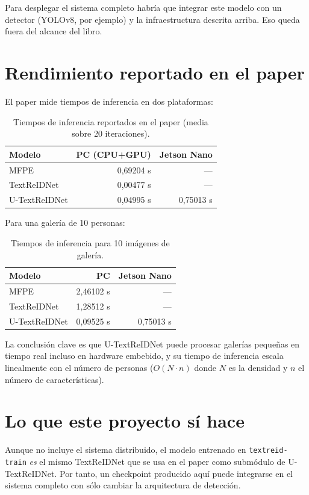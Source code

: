 Para desplegar el sistema completo habría que integrar este modelo
con un detector (YOLOv8, por ejemplo) y la infraestructura
descrita arriba. Eso queda fuera del alcance del libro.

\section{Rendimiento reportado en el paper}

El paper mide tiempos de inferencia en dos plataformas:

\begin{table}[H]
\centering
\caption{Tiempos de inferencia reportados en el paper (media sobre
20 iteraciones).}
\label{tab:tiempos-paper}
\begin{tabular}{lrr}
\toprule
\textbf{Modelo} & \textbf{PC (CPU+GPU)} & \textbf{Jetson Nano} \\
\midrule
MFPE        & 0{,}69204 s & --- \\
TextReIDNet & 0{,}00477 s & --- \\
U-TextReIDNet & 0{,}04995 s & 0{,}75013 s \\
\bottomrule
\end{tabular}
\end{table}

\noindent Para una galería de 10 personas:

\begin{table}[H]
\centering
\caption{Tiempos de inferencia para 10 imágenes de galería.}
\begin{tabular}{lrr}
\toprule
\textbf{Modelo} & \textbf{PC} & \textbf{Jetson Nano} \\
\midrule
MFPE          & 2{,}46102 s & --- \\
TextReIDNet   & 1{,}28512 s & --- \\
U-TextReIDNet & 0{,}09525 s & 0{,}75013 s \\
\bottomrule
\end{tabular}
\end{table}

\noindent La conclusión clave es que U-TextReIDNet puede procesar
galerías pequeñas en tiempo real incluso en hardware embebido, y
su tiempo de inferencia escala linealmente con el número de
personas ($O(N \cdot n)$ donde $N$ es la densidad y $n$ el
número de características).

\section{Lo que este proyecto sí hace}

Aunque no incluye el sistema distribuido, el modelo entrenado en
\texttt{textreid-train} \emph{es} el mismo TextReIDNet que se usa
en el paper como submódulo de U-TextReIDNet. Por tanto, un
checkpoint producido aquí puede integrarse en el sistema
completo con sólo cambiar la arquitectura de detección.
